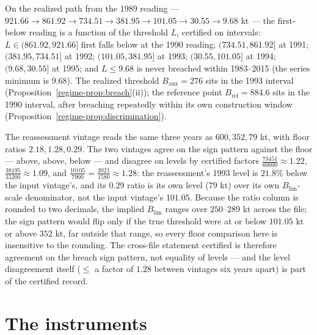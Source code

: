 \begin{remark}\label{regime-rem:frontier}
On the realized path from the 1989 reading --- \(921.66 \to 861.92 \to
734.51 \to 381.95 \to 101.05 \to 30.55 \to 9.68\) kt --- the
first-below reading is a function of the threshold \(L\), certified on
intervals: \(L \in (861.92, 921.66]\) first falls below at the 1990
reading; \((734.51, 861.92]\) at 1991; \((381.95, 734.51]\) at 1992;
\((101.05, 381.95]\) at 1993; \((30.55, 101.05]\) at 1994;
\((9.68, 30.55]\) at 1995; and \(L \le 9.68\) is never breached within
1983--2015 (the series minimum is \(9.68\)). The realized threshold
\(B_{\mathrm{aux}} = 276\) sits in the 1993 interval
(Proposition~\ref{regime-prop:breach}(ii)); the reference point
\(B_{\mathrm{ref}} = 884.6\) sits in the 1990 interval, after breaching
repeatedly within its own construction window
(Proposition~\ref{regime-prop:discrimination}).
\end{remark}

\begin{remark}\label{regime-rem:xtevintage}
The reassessment vintage reads the same three years as
\(600, 352, 79\) kt, with floor ratios \(2.18, 1.28, 0.29\). The two
vintages agree on the sign pattern against the floor --- above, above,
below --- and disagree on levels by certified factors
\(\tfrac{73451}{60000} \approx 1.22\),
\(\tfrac{38195}{35200} \approx 1.09\), and
\(\tfrac{10105}{7900} = \tfrac{2021}{1580} \approx 1.28\): the
reassessment's 1993 level is \(21.8\%\) below the input vintage's, and
its \(0.29\) ratio is its own level (\(79\) kt) over its own
\(B_{\mathrm{lim}}\)-scale denominator, not the input vintage's
\(101.05\). Because the ratio column is rounded to two decimals, the
implied \(B_{\mathrm{lim}}\) ranges over \(250\)--\(289\) kt across
the file; the sign pattern would flip only if the true threshold were
at or below \(101.05\) kt or above \(352\) kt, far outside that range,
so every floor comparison here is insensitive to the rounding. The
cross-file statement certified is therefore agreement on the breach
sign pattern, not equality of levels --- and the level disagreement
itself (\(\le\) a factor of \(1.28\) between vintages six years
apart) is part of the certified record.
\end{remark}

\section{The instruments}\label{regime-instruments}

